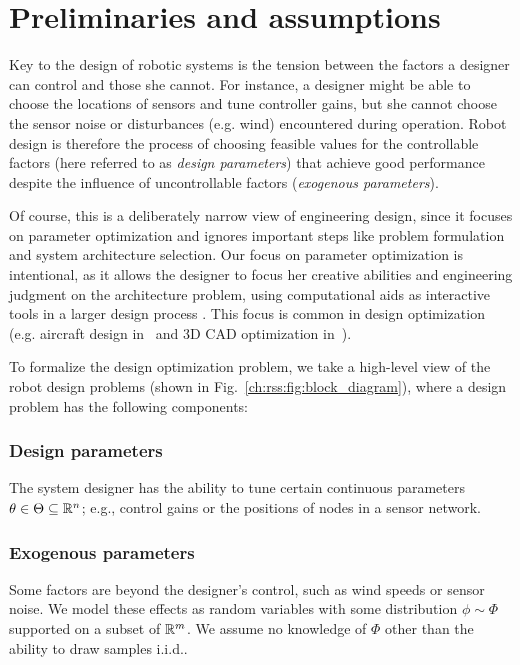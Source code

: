 \section{Preliminaries and assumptions}\label{ch:rss:prelim}

Key to the design of robotic systems is the tension between the factors a designer can control and those she cannot. For instance, a designer might be able to choose the locations of sensors and tune controller gains, but she cannot choose the sensor noise or disturbances (e.g. wind) encountered during operation.
Robot design is therefore the process of choosing feasible values for the controllable factors (here referred to as \textit{design parameters}) that achieve good performance despite the influence of uncontrollable factors (\textit{exogenous parameters}).

Of course, this is a deliberately narrow view of engineering design, since it focuses on parameter optimization and ignores important steps like problem formulation and system architecture selection. Our focus on parameter optimization is intentional, as it allows the designer to focus her creative abilities and engineering judgment on the architecture problem, using computational aids as interactive tools in a larger design process \cite{sharpe_thesis,cascaval2021differentiable}. This focus is common in design optimization (e.g. aircraft design in~\cite{sharpe_thesis} and 3D CAD optimization in~\cite{cascaval2021differentiable}).

To formalize the design optimization problem, we take a high-level view of the robot design problems (shown in Fig.~\ref{ch:rss:fig:block_diagram}), where a design problem has the following components:

\subsubsection{Design parameters} The system designer has the ability to tune certain continuous parameters $\theta \in \Theta \subseteq \mathbb{R}^n$; e.g., control gains or the positions of nodes in a sensor network.
\subsubsection{Exogenous parameters} Some factors are beyond the designer's control, such as wind speeds or sensor noise. We model these effects as random variables with some distribution $\phi \sim \Phi$ supported on a subset of $\mathbb{R}^m$. We assume no knowledge of $\Phi$ other than the ability to draw samples i.i.d..
